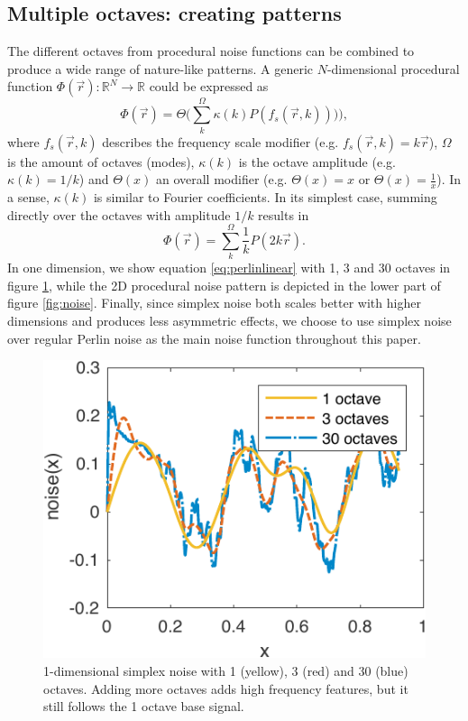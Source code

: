 \documentclass[aps,pre,twocolumn,letterpaper,floatfix,showpacs]{revtex4}
\begin{document}
\subsection{Multiple octaves: creating patterns}
\label{sec:octaves}
The different octaves from procedural noise functions can be combined
to produce a wide range of nature-like patterns. A generic
$N$-dimensional procedural function $\Phi(\vec r): \mathbb R^N \to
\mathbb R$ could be expressed as
\begin{equation}
\label{eq:procedural}
 \Phi(\vec r) = \Theta \Big(\sum_k^\Omega \kappa (k) P(  f_s (\vec r,k) )) \Big),
 \end{equation}
where $f_s(\vec r,k)$ describes the frequency scale modifier (e.g. $f_s(\vec r,k) =
k\vec r$), $\Omega$ is the amount of octaves (modes), $\kappa(k)$ is the octave amplitude (e.g. $\kappa(k) = 1/k$)
and $\Theta(x)$ an overall modifier (e.g. $\Theta(x) = x$ or
$\Theta(x) = \frac{1}{x}$). In a sense, $\kappa(k)$ is similar to Fourier coefficients. 
In its simplest case, summing directly over the octaves with amplitude $1/k$ results in 
\begin{equation}
\label{eq:perlinlinear}
 \Phi(\vec r) = \sum_k^\Omega \frac{1}{k} P( 2k\vec r).
\end{equation}
In one dimension, we show equation \ref{eq:perlinlinear} with 1, 3 and 30 octaves
in figure \ref{fig:1dperlin}, while the 2D procedural noise pattern is depicted in the lower
part of figure \ref{fig:noise}. Finally, since simplex noise both scales better
with higher dimensions and produces less asymmetric effects, we choose to use
simplex noise over regular Perlin noise as the main noise function throughout this paper.

\begin{figure}
\includegraphics[width=.5\textwidth]{1d_noise.pdf}
\caption{1-dimensional simplex noise with 1 (yellow), 3 (red) and 30 (blue) octaves. Adding more octaves adds high frequency features, but it still follows the 1 octave base signal.}
\label{fig:1dperlin}
\end{figure}
\end{document}
